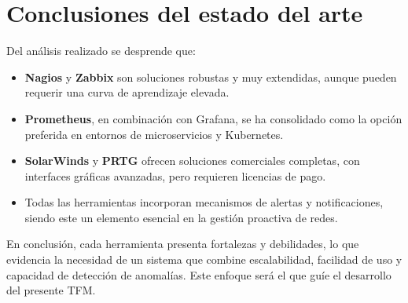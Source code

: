 \section{Conclusiones del estado del arte}
Del análisis realizado se desprende que:
\begin{itemize}
    \item \textbf{Nagios} y \textbf{Zabbix} son soluciones robustas y muy extendidas, aunque pueden requerir una curva de aprendizaje elevada.
    \item \textbf{Prometheus}, en combinación con Grafana, se ha consolidado como la opción preferida en entornos de microservicios y Kubernetes.
    \item \textbf{SolarWinds} y \textbf{PRTG} ofrecen soluciones comerciales completas, con interfaces gráficas avanzadas, pero requieren licencias de pago.
    \item Todas las herramientas incorporan mecanismos de alertas y notificaciones, siendo este un elemento esencial en la gestión proactiva de redes.
\end{itemize}

En conclusión, cada herramienta presenta fortalezas y debilidades, lo que evidencia la necesidad de un sistema que combine escalabilidad, facilidad de uso y capacidad de detección de anomalías. Este enfoque será el que guíe el desarrollo del presente TFM.